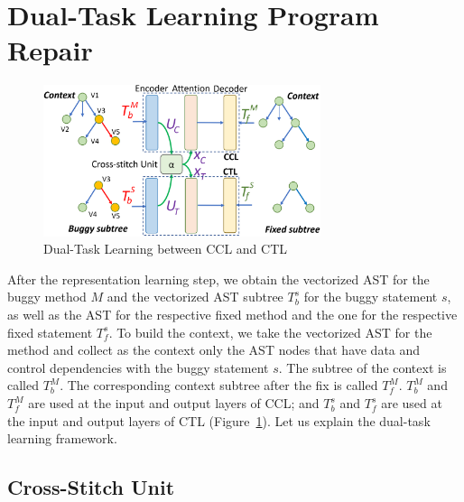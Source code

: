 \section{Dual-Task Learning Program Repair}
\label{sec: dual-learning}

\begin{figure}[t]
	\centering
	\includegraphics[width=3.2in]{graphs/dual-learning-repair-4.png}
        \vspace{-3pt}
	\caption{Dual-Task Learning between CCL and CTL}
	\label{fig:dual-learning}
\end{figure}

After the representation learning step, we obtain the vectorized AST
for the buggy method $M$ and the vectorized AST subtree
$T^{s}_b$ for the buggy statement $s$, as well as the AST for the
respective fixed method
and the one for the respective fixed statement $T^{s}_f$.
%
To build the context, we take the vectorized AST for the method and
collect as the context only the AST nodes that have data and control
dependencies with the buggy statement $s$. The subtree of the context
is called $T^{M}_b$. The corresponding context subtree after the fix
is called $T^{M}_f$.
%
$T^{M}_b$ and $T^{M}_f$ are used at the input and output layers of
CCL; and $T^{s}_b$ and $T^{s}_f$ are used at the input and output
layers of CTL (Figure~\ref{fig:dual-learning}).  Let us explain the
dual-task learning framework.



\subsection{Cross-Stitch Unit}

